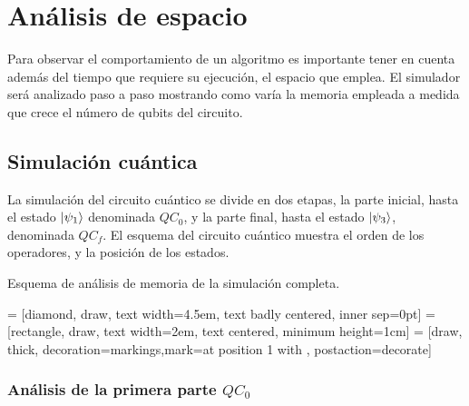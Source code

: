 \section{Análisis de espacio}
Para observar el comportamiento de un algoritmo es importante tener en cuenta 
además del tiempo que requiere su ejecución, el espacio que emplea. El simulador 
será analizado paso a paso mostrando como varía la memoria empleada a medida que 
crece el número de qubits del circuito.

\subsection{Simulación cuántica}
La simulación del circuito cuántico se divide en dos etapas, la parte inicial, 
hasta el estado $\ket{\psi_{1}}$ denominada $QC_0$, y la parte final, hasta el estado 
$\ket{\psi_{3}}$, denominada $QC_f$. El esquema del circuito cuántico muestra el orden 
de los operadores, y la posición de los estados.
%

%
Esquema de análisis de memoria de la simulación completa.
%
\begin{center}
 = [diamond, draw, text width=4.5em, text badly centered, 
inner sep=0pt]
 = [rectangle, draw, text width=2em, text centered, minimum 
height=1cm]
 = [draw, thick, decoration={markings,mark=at position 
1 with {}}, postaction={decorate}]
%
\end{center}
%
\subsubsection{Análisis de la primera parte $QC_0$}

